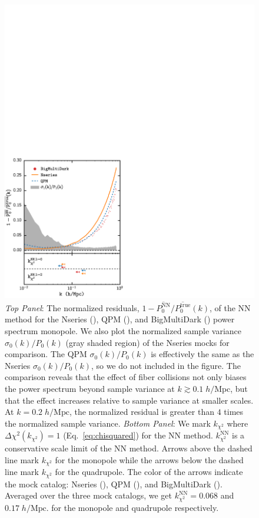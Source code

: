 \begin{figure}
\begin{center}
\includegraphics[scale=0.4]{figs/fc/mock_catalog_NN_true_P0k_norm_resid_rebin6x.pdf} 
\caption{{\it Top Panel}: The normalized residuals, 
$1 - \overline{P_0^\mathrm{NN}}/\overline{P_0^\mathrm{true}}(k)$, 
of the NN method for the Nseries (\nseriescolor), 
QPM (\qpmcolor), and BigMultiDark (\bmdcolor) power spectrum monopole. 
We also plot the normalized sample variance $\sigma_0(k) / P_0(k)$ 
(gray shaded region) of the Nseries mocks for comparison.
The QPM $\sigma_0(k) / P_0(k)$ is effectively the same as the Nseries 
$\sigma_0(k)/P_0(k)$, so we do not included in the figure. 
The comparison reveals that the effect of fiber collisions not only 
biases the power spectrum beyond sample variance at $k \gtrsim 0.1 \;h/\mathrm{Mpc}$, 
but that the effect increases relative to sample variance at smaller scales. At 
$k = 0.2\;h/\mathrm{Mpc}$,  
the normalized residual is greater than $4$ times the normalized sample variance.
{\it Bottom Panel}: We mark $k_{\chi^2}$ where $\Delta \chi^2(k_{\chi^2}) = 1$ (Eq.~\ref{eq:chisquared}) for the NN method. $k^\mathrm{NN}_{\chi^2}$ is a conservative 
scale limit of the NN method. Arrows above the dashed 
line mark $k_{\chi^2}$ for the monopole while the arrows below the dashed line mark
$k_{\chi^2}$ for the quadrupole. The color of the arrows indicate the mock catalog: 
Nseries (\nseriescolor), QPM (\qpmcolor), and BigMultiDark (\bmdcolor). Averaged
over the three mock catalogs, we get $k^\mathrm{NN}_{\chi^2} = 0.068$ and $0.17 \;h/\mathrm{Mpc}$.
for the monopole and quadrupole respectively.}
\label{fig:NN_norm_resid}
\end{center}
\end{figure}
